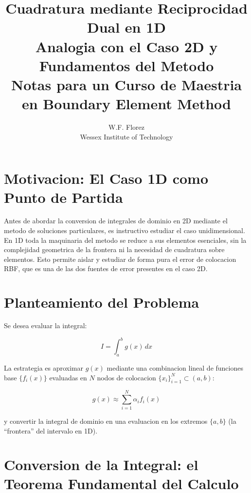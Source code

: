 \documentclass[12pt,a4paper]{article}
\title{\textbf{Cuadratura mediante Reciprocidad Dual en 1D}\\[0.5em]
\large Analogia con el Caso 2D y Fundamentos del Metodo\\[0.3em]
\normalsize Notas para un Curso de Maestria en Boundary Element Method}
\author{W.F. Florez\\
\small Wessex Institute of Technology}
\date{}
\begin{document}
\maketitle
\tableofcontents
\newpage

\section{Motivacion: El Caso 1D como Punto de Partida}

Antes de abordar la conversion de integrales de dominio en 2D mediante el
metodo de soluciones particulares, es instructivo estudiar el caso
unidimensional. En 1D toda la maquinaria del metodo se reduce a sus elementos
esenciales, sin la complejidad geometrica de la frontera ni la necesidad de
cuadratura sobre elementos. Esto permite aislar y estudiar de forma pura el
error de colocacion RBF, que es una de las dos fuentes de error presentes
en el caso 2D.

\section{Planteamiento del Problema}

Se desea evaluar la integral:

\begin{equation}
    I = \int_a^b g(x)\, dx
    \label{eq:integral_1d}
\end{equation}

La estrategia es aproximar $g(x)$ mediante una combinacion lineal de
funciones base $\{f_i(x)\}$ evaluadas en $N$ nodos de colocacion
$\{x_i\}_{i=1}^N \subset (a,b)$:

\begin{equation}
    g(x) \approx \sum_{i=1}^{N} \alpha_i f_i(x)
    \label{eq:aprox_g}
\end{equation}

y convertir la integral de dominio en una evaluacion en los extremos
$\{a, b\}$ (la ``frontera'' del intervalo en 1D).

\section{Conversion de la Integral: el Teorema Fundamental del Calculo}
\end{document}
